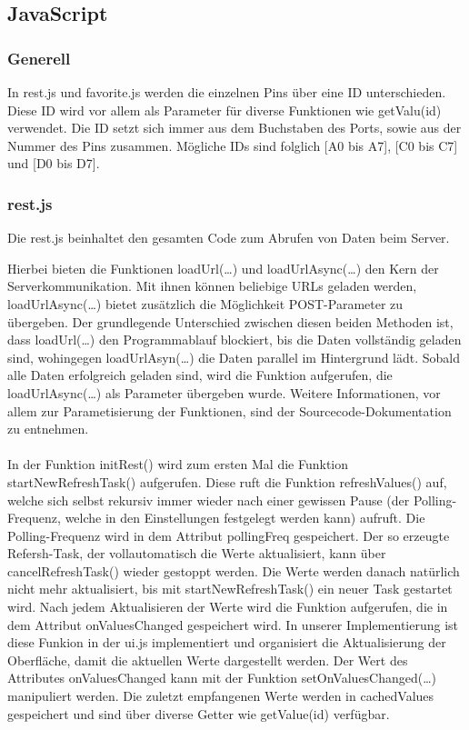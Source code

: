 \subsection{JavaScript}
\subsubsection{Generell}
In \textrm{rest.js} und \textrm{favorite.js} werden die einzelnen Pins über eine
ID unterschieden. Diese ID wird vor allem als Parameter für diverse Funktionen
wie \textrm{getValu(id)} verwendet. Die ID setzt sich immer aus dem Buchstaben des
Ports, sowie aus der Nummer des Pins zusammen. Mögliche IDs sind folglich [A0
bis A7], [C0 bis C7] und [D0 bis D7].

\subsubsection{rest.js}
Die \textrm{rest.js} beinhaltet den gesamten Code zum Abrufen von Daten beim
Server.

Hierbei bieten die Funktionen \textrm{loadUrl(\ldots)} und
\textrm{loadUrlAsync(\ldots)} den Kern der Serverkommunikation. Mit ihnen können
beliebige URLs geladen werden, \textrm{loadUrlAsync(\ldots)} bietet zusätzlich
die Möglichkeit POST-Parameter zu übergeben. Der grundlegende Unterschied
zwischen diesen beiden Methoden ist, dass \textrm{loadUrl(\ldots)} den
Programmablauf blockiert, bis die Daten vollständig geladen sind, wohingegen
\textrm{loadUrlAsyn(\ldots)} die Daten parallel im Hintergrund lädt. Sobald alle
Daten erfolgreich geladen sind, wird die Funktion aufgerufen, die
\textrm{loadUrlAsync(\ldots)} als Parameter übergeben wurde. Weitere
Informationen, vor allem zur Parametisierung der Funktionen, sind der
Sourcecode-Dokumentation zu entnehmen.\\
\\
In der Funktion \textrm{initRest()} wird zum ersten Mal die Funktion
\textrm{startNewRefreshTask()} aufgerufen. Diese ruft die Funktion
\textrm{refreshValues()} auf, welche sich selbst rekursiv immer wieder nach
einer gewissen Pause (der Polling-Frequenz, welche in den Einstellungen
festgelegt werden kann) aufruft. Die Polling-Frequenz wird in dem Attribut
\textrm{pollingFreq} gespeichert. Der so erzeugte Refersh-Task, der
vollautomatisch die Werte aktualisiert, kann über \textrm{cancelRefreshTask()}
wieder gestoppt werden. Die Werte werden danach natürlich nicht mehr
aktualisiert, bis mit \textrm{startNewRefreshTask()} ein neuer Task gestartet
wird. Nach jedem Aktualisieren der Werte wird die Funktion aufgerufen, die in
dem Attribut \textrm{onValuesChanged} gespeichert wird. In unserer
Implementierung ist diese Funkion in der \textrm{ui.js} implementiert und
organisiert die Aktualisierung der Oberfläche, damit die aktuellen Werte
dargestellt werden. Der Wert des Attributes \textrm{onValuesChanged} kann mit
der Funktion \textrm{setOnValuesChanged(\ldots)} manipuliert werden. Die zuletzt
empfangenen Werte werden in \textrm{cachedValues} gespeichert und sind über
diverse Getter wie \textrm{getValue(id)} verfügbar.

